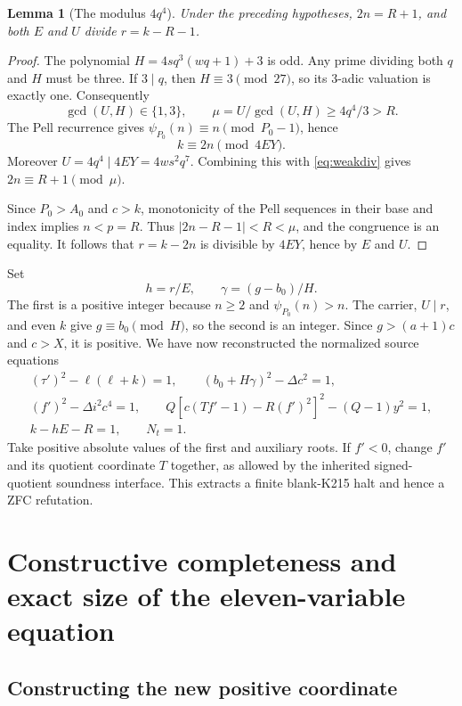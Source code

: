 \documentclass[11pt,a4paper]{article}
\newtheorem{lemma}[theorem]{Lemma}
\theoremstyle{definition}
\theoremstyle{remark}
\numberwithin{equation}{section}
\begin{document}
\begin{lemma}[The modulus $4q^4$]\label{lem:modulus}
Under the preceding hypotheses, $2n=R+1$, and both $E$ and $U$
divide $r=k-R-1$.
\end{lemma}
\begin{proof}
The polynomial $H=4sq^3(wq+1)+3$ is odd. Any prime dividing
both $q$ and $H$ must be three. If $3\mid q$, then
$H\equiv3\pmod{27}$, so its 3-adic valuation is exactly one.
Consequently
\[
 \gcd(U,H)\in\{1,3\},\qquad
 \mu=U/\gcd(U,H)\ge4q^4/3>R.
\]
The Pell recurrence gives
$\psi_{P_0}(n)\equiv n\pmod{P_0-1}$, hence
\[
 k\equiv2n\pmod{4EY}.
\]
Moreover $U=4q^4\mid4EY=4ws^2q^7$. Combining this with
\eqref{eq:weakdiv} gives $2n\equiv R+1\pmod\mu$.

Since $P_0>A_0$ and $c>k$, monotonicity of the Pell sequences
in their base and index implies $n<p=R$. Thus
$|2n-R-1|<R<\mu$, and the congruence is an equality.
It follows that $r=k-2n$ is divisible by $4EY$, hence by $E$ and $U$.
\end{proof}

Set
\[
 h=r/E,\qquad \gamma=(g-b_0)/H.
\]
The first is a positive integer because $n\ge2$ and
$\psi_{P_0}(n)>n$. The carrier, $U\mid r$, and even $k$
give $g\equiv b_0\pmod H$, so the second is an integer.
Since $g>(a+1)c$ and $c>X$, it is positive. We have now
reconstructed the normalized source equations
\begin{gather*}
 (\tau')^2-\ell(\ell+k)=1,\qquad
 (b_0+H\gamma)^2-\Delta c^2=1,\\
 (f')^2-\Delta i^2c^4=1,\qquad
 Q[c(Tf'-1)-R(f')^2]^2-(Q-1)y^2=1,\\
 k-hE-R=1,\qquad N_t=1.
\end{gather*}
Take positive absolute values of the first and auxiliary roots. If
$f'<0$, change $f'$ and its quotient coordinate $T$ together,
as allowed by the inherited signed-quotient soundness interface.
This extracts a finite blank-K215 halt and hence a ZFC refutation.

\section{Constructive completeness and exact size of the eleven-variable equation}

\subsection{Constructing the new positive coordinate}
\end{document}
